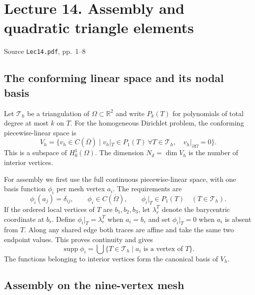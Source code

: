 \documentclass[11pt,a4paper]{article}
\newcommand{\lecturesource}[1]{%
  \par{\small\sffamily\color{Muted}#1}\par\vspace{0.15em}}
\begin{document}
\clearpage
\section{Lecture 14. Assembly and quadratic triangle elements}
\lecturesource{Source \enspace\texttt{Lec14.pdf}, pp.~1--8}
\label{sec:mtl781-lec14}

\subsection{The conforming linear space and its nodal basis}

Let \(\mathcal T_h\) be a triangulation of \(\Omega\subset\mathbb R^2\) and write \(P_k(T)\) for polynomials of total degree at most \(k\) on \(T\). For the homogeneous Dirichlet problem, the conforming piecewise-linear space is
\[
 V_h=\{v_h\in C(\overline\Omega)\mid
              v_h|_T\in P_1(T)\ \forall T\in\mathcal T_h,\quad
              v_h|_{\partial\Omega}=0\}.
\]
This is a subspace of \(H_0^1(\Omega)\). The dimension \(N_d=\dim V_h\) is the number of interior vertices.

For assembly we first use the full continuous piecewise-linear space, with one basis function \(\phi_i\) per mesh vertex \(a_i\). The requirements are
\[
 \phi_i(a_j)=\delta_{ij},\qquad
 \phi_i\in C(\overline\Omega),\qquad
 \phi_i|_T\in P_1(T)\quad(T\in\mathcal T_h).
\]
If the ordered local vertices of \(T\) are \(b_1,b_2,b_3\), let \(\lambda_r^T\) denote the barycentric coordinate at \(b_r\). Define \(\phi_i|_T=\lambda_r^T\) when \(a_i=b_r\) and set \(\phi_i|_T=0\) when \(a_i\) is absent from \(T\). Along any shared edge both traces are affine and take the same two endpoint values. This proves continuity and gives
\[
 \operatorname{supp}\phi_i
   =\bigcup\{T\in\mathcal T_h\mid a_i\text{ is a vertex of }T\}.
\]
The functions belonging to interior vertices form the canonical basis of \(V_h\).

\subsection{Assembly on the nine-vertex mesh}
\end{document}
